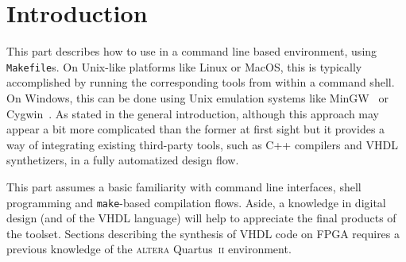 
\chapter*{Introduction}
\label{sec:cl-intro}

This part describes how to use \caph in a command line based environment, using
\texttt{Makefile}s. On Unix-like platforms like Linux or MacOS, this is typically accomplished by
running the corresponding tools from within a command shell. On Windows, this can be done using Unix
emulation systems like MinGW~\cite{MinGW} or Cygwin~\cite{CygWin}.  As stated in the general
introduction, although this approach may appear a bit more complicated than the former at first
sight but it provides a way of integrating existing third-party tools, such as C++ compilers and
VHDL synthetizers, in a fully automatized design flow. 

\medskip This part assumes a basic familiarity with command line interfaces, shell programming
and \texttt{make}-based compilation flows. Aside, a knowledge in digital design (and of the VHDL
language) will help to appreciate the final products of the \caph toolset. Sections describing the
synthesis of VHDL code on FPGA requires a previous knowledge of the \textsc{altera}
Quartus~\textsc{ii} environment.

